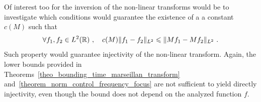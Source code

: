 Of interest too for the inversion of the non-linear transforms would be to investigate which conditions would guarantee the existence of a a constant $c(M)$ such that
\begin{equation}
    \forall f_1,f_2\in L^2(\R)\ ,\quad  c(M)\|f_1-f_2\|_{L^2} \leqslant\|Mf_1 - Mf_2 \|_{L^2}\ .
\end{equation}
Such property would guarantee injectivity of the non-linear transform. Again, the lower bounds provided in Theorems~\ref{theo_bounding_time_marseillan_transform} and~\ref{theorem_norm_control_frequency_focus} are not sufficient to yield directly injectivity, even though the bound does not depend on the analyzed function $f$.

